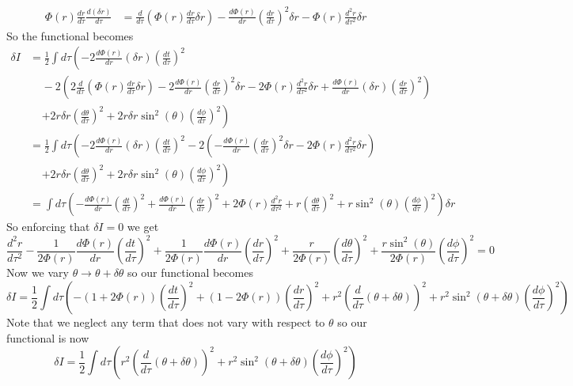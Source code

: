 \documentclass[11pt]{article}
\numberwithin{equation}{section}
\begin{document}
\begin{enumerate}[(a)]
\begin{align*}
\Phi(r)\frac{dr}{d\tau}\frac{d(\delta r)}{d\tau} &= \frac{d}{d\tau}\left(\Phi(r)\frac{dr}{d\tau}\delta r\right) - \frac{d\Phi(r)}{dr}\left(\frac{dr}{d\tau}\right)^2\delta r - \Phi(r)\frac{d^2r}{d\tau^2}\delta r 
\end{align*}
So the functional becomes
\begin{align*}
\delta I &= \frac{1}{2}\int d\tau\left(-2\frac{d\Phi(r)}{dr}(\delta r)\left(\frac{dt}{d\tau}\right)^2\right. \\
&\ \ \ \ \ - 2\left(2\frac{d}{d\tau}\left(\Phi(r)\frac{dr}{d\tau}\delta r\right) - 2\frac{d\Phi(r)}{dr}\left(\frac{dr}{d\tau}\right)^2\delta r - 2\Phi(r)\frac{d^2r}{d\tau^2}\delta r  + \frac{d\Phi(r)}{dr}(\delta r)\left(\frac{dr}{d\tau}\right)^2\right)\\
&\ \ \ \ \ \left. +2r\delta r\left(\frac{d\theta}{d\tau}\right)^2 + 2r\delta r\sin^2(\theta)\left(\frac{d\phi}{d\tau}\right)^2\right)\\
&= \frac{1}{2}\int d\tau\left(-2\frac{d\Phi(r)}{dr}(\delta r)\left(\frac{dt}{d\tau}\right)^2 - 2\left(-\frac{d\Phi(r)}{dr}\left(\frac{dr}{d\tau}\right)^2\delta r - 2\Phi(r)\frac{d^2r}{d\tau^2}\delta r \right)\right.\\
&\ \ \ \ \ \left. +2r\delta r\left(\frac{d\theta}{d\tau}\right)^2 + 2r\delta r\sin^2(\theta)\left(\frac{d\phi}{d\tau}\right)^2\right)\\
&= \int d\tau\left(-\frac{d\Phi(r)}{dr}\left(\frac{dt}{d\tau}\right)^2 + \frac{d\Phi(r)}{dr}\left(\frac{dr}{d\tau}\right)^2 + 2\Phi(r)\frac{d^2r}{d\tau^2} + r\left(\frac{d\theta}{d\tau}\right)^2 + r\sin^2(\theta)\left(\frac{d\phi}{d\tau}\right)^2\right)\delta r
\end{align*}
So enforcing that $\delta I = 0$ we get
$$\frac{d^2r}{d\tau^2} - \frac{1}{2\Phi(r)}\frac{d\Phi(r)}{dr}\left(\frac{dt}{d\tau}\right)^2 +\frac{1}{2\Phi(r)} \frac{d\Phi(r)}{dr}\left(\frac{dr}{d\tau}\right)^2  +\frac{r}{2\Phi(r)} \left(\frac{d\theta}{d\tau}\right)^2 + \frac{r\sin^2(\theta)}{2\Phi(r)}\left(\frac{d\phi}{d\tau}\right)^2 = 0$$
Now we vary $\theta\rightarrow\theta+\delta\theta$ so our functional becomes
$$\delta I = \frac{1}{2}\int d\tau\left(-(1+2\Phi(r))\left(\frac{dt}{d\tau}\right)^2 + (1-2\Phi(r))\left(\frac{dr}{d\tau}\right)^2 + r^2\left(\frac{d}{d\tau}(\theta+\delta\theta)\right)^2+r^2\sin^2(\theta+\delta\theta)\left(\frac{d\phi}{d\tau}\right)^2\right)$$
Note that we neglect any term that does not vary with respect to $\theta$ so our functional is now
$$\delta I = \frac{1}{2}\int d\tau\left(r^2\left(\frac{d}{d\tau}(\theta+\delta\theta)\right)^2+r^2\sin^2(\theta+\delta\theta)\left(\frac{d\phi}{d\tau}\right)^2\right)$$

\end{enumerate}
\end{document}
